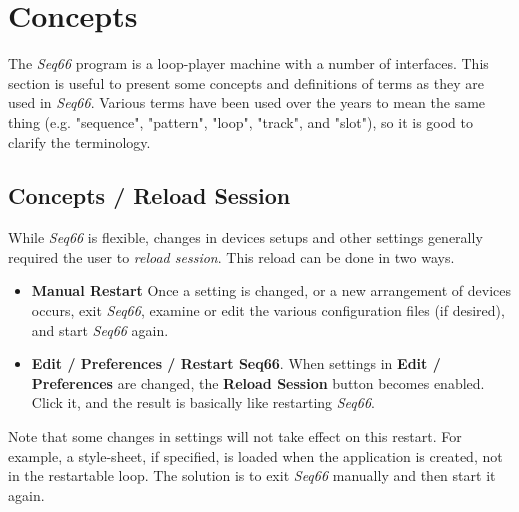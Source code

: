%
%
%

\section{Concepts}
\label{sec:concepts}

   The \textsl{Seq66} program is a loop-player machine with a 
   number of interfaces.  This section is useful
   to present some concepts and definitions of terms as
   they are used in \textsl{Seq66}.  Various terms have been used over
   the years to mean the same thing (e.g. "sequence", "pattern", "loop",
   "track", and "slot"), so it is good to clarify the terminology.

\subsection{Concepts / Reload Session}
\label{subsec:concepts_reload_session}

   While \textsl{Seq66} is flexible, changes in devices setups and other
   settings generally required the user to \textsl{reload session}.
   This reload can be done in two ways.

   \begin{itemize}
      \item \textbf{Manual Restart}
         Once a setting is changed, or a new arrangement of devices occurs,
         exit \textsl{Seq66}, examine or edit the various configuration files
         (if desired), and start \textsl{Seq66} again.
      \item \textbf{Edit / Preferences / Restart Seq66}.
         When settings in \textbf{Edit / Preferences} are changed, the
         \textbf{Reload Session} button becomes enabled.
         Click it, and the result is basically like restarting \textsl{Seq66}.
   \end{itemize}

   Note that some changes in settings will not take effect on this restart.
   For example, a style-sheet, if specified, is loaded when the application is
   created, not in the restartable loop.
   The solution is to exit \textsl{Seq66} manually and then start it again.

